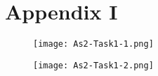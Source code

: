 \pagebreak

\section*{Appendix I}
\begin{figure}[h!]
        \centering
        \texttt{[image: As2-Task1-1.png]}
\end{figure}

\pagebreak

\begin{figure}[h!]
        \centering
        \texttt{[image: As2-Task1-2.png]}
\end{figure}